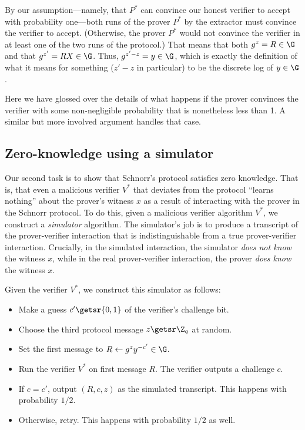 By our assumption---namely, that $P^*$ can convince our honest verifier
to accept with probability one---both
runs of the prover $P^*$ by the extractor must convince the verifier to accept. (Otherwise,
the prover $P^*$ would not convince the verifier in at least one of the two runs of the protocol.)
That means that both $g^z=R \in \G$ and that $g^{z'}=RX \in \G$.  Thus, $g^{z'-z}=y \in \G$,
which is exactly the definition of what it means for something ($z'-z$
in particular) to be the discrete log of $y \in \G$.

Here we have glossed over the details of what happens if the prover
convinces the verifier with some non-negligible probability that is
nonetheless less than 1.
A similar but more involved argument handles that case.

\subsection{Zero-knowledge using a simulator}

Our second task is to show that Schnorr's protocol satisfies zero knowledge.
That is, that even a malicious verifier $V^*$ that deviates from
the protocol ``learns nothing'' about the prover's witness
$x$ as a result of interacting with the prover in the Schnorr protocol.
To do this, given a malicious verifier algorithm $V^*$, we construct a \emph{simulator} algorithm.
The simulator's job
is to produce a transcript of the prover-verifier interaction that is
indistinguishable from a true prover-verifier interaction.
Crucially, in the simulated interaction, the simulator \emph{does not know} the witness $x$,
while in the real prover-verifier interaction, the prover \emph{does know} the witness $x$.

Given the verifier $V^*$, 
we construct this simulator as follows:

\begin{itemize}

  \item Make a guess $c' \getsr \{0,1\}$ of the verifier's challenge bit.

  \item Choose the third protocol message $z \getsr \Z_q$ at random.

  \item Set the first message to $R \gets g^z y^{-c'} \in \G$.

  \item Run the verifier $V^*$ on first message $R$.
        The verifier outputs a challenge $c$.
  \item If $c=c'$, output $(R, c, z)$ as the simulated transcript.
        This happens with probability $1/2$.

\item Otherwise, retry.  This happens with probability $1/2$ as well.

\end{itemize}

